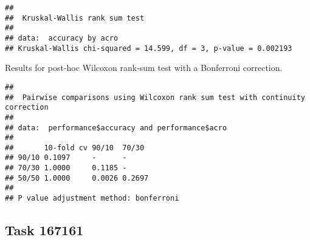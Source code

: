 \documentclass[
]{book}
\newenvironment{Shaded}{\begin{snugshade}}{\end{snugshade}}
\newcommand{\AttributeTok}[1]{\textcolor[rgb]{0.13,0.29,0.53}{#1}}
\newcommand{\ConstantTok}[1]{\textcolor[rgb]{0.56,0.35,0.01}{#1}}
\newcommand{\FunctionTok}[1]{\textcolor[rgb]{0.13,0.29,0.53}{\textbf{#1}}}
\newcommand{\NormalTok}[1]{#1}
\newcommand{\SpecialCharTok}[1]{\textcolor[rgb]{0.81,0.36,0.00}{\textbf{#1}}}
\newcommand{\StringTok}[1]{\textcolor[rgb]{0.31,0.60,0.02}{#1}}
\begin{document}
\begin{verbatim}
## 
##  Kruskal-Wallis rank sum test
## 
## data:  accuracy by acro
## Kruskal-Wallis chi-squared = 14.599, df = 3, p-value = 0.002193
\end{verbatim}

Results for post-hoc Wilcoxon rank-sum test with a Bonferroni correction.

\begin{Shaded}
\end{Shaded}

\begin{verbatim}
## 
##  Pairwise comparisons using Wilcoxon rank sum test with continuity correction 
## 
## data:  performance$accuracy and performance$acro 
## 
##       10-fold cv 90/10  70/30 
## 90/10 0.1097     -      -     
## 70/30 1.0000     0.1185 -     
## 50/50 1.0000     0.0026 0.2697
## 
## P value adjustment method: bonferroni
\end{verbatim}

\hypertarget{task-167161}{%
\subsection{Task 167161}\label{task-167161}}
\end{document}
